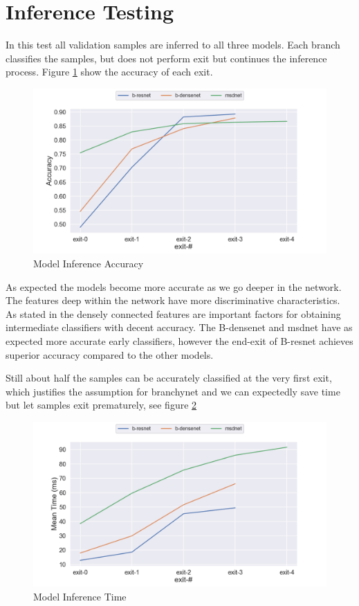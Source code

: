 \section{Inference Testing}

In this test all validation samples are inferred to all three models. Each branch classifies the samples, but does not perform exit but continues the inference process. Figure \ref{fig:exit-accuracy} show the accuracy of each exit.  

\begin{figure}
	\includegraphics[width=\linewidth]{figures/inference_plots/exit_acc}
	\caption[Model Inference Accuracy]{Model Inference Accuracy}
	\label{fig:exit-accuracy}
\end{figure}

As expected the models become more accurate as we go deeper in the network. The features deep within the network have more discriminative characteristics. As stated in \cite{huang_multi-scale_2017} the densely connected features are important factors for obtaining intermediate classifiers with decent accuracy. The B-\gls{densenet} and \gls{msdnet} have as expected more accurate early classifiers, however the end-exit of B-\gls{resnet} achieves superior accuracy compared to the other models.

Still about half the samples can be accurately classified at the very first exit, which justifies the assumption for \gls{branchynet} and we can expectedly save time but let samples exit prematurely, see figure \ref{fig:exit-time}

\begin{figure}
	\includegraphics[width=\linewidth]{figures/inference_plots/exit_time}
	\caption[Model Inference Accuracy]{Model Inference Time}
	\label{fig:exit-time}
\end{figure}

